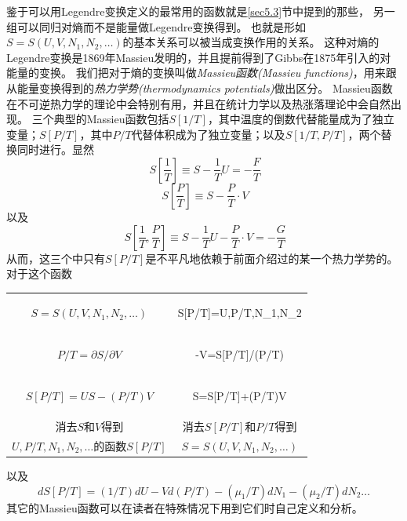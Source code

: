 鉴于可以用Legendre变换定义的最常用的函数就是\ref{sec5.3}节中提到的那些，
另一组可以同归对熵而不是能量做Legendre变换得到。
也就是形如$S=S(U,V,N_1,N_2,\dots)$的基本关系可以被当成变换作用的关系。
这种对熵的Legendre变换是1869年Massieu发明的，并且提前得到了Gibbs在1875年引入的对能量的变换。
我们把对于熵的变换叫做{\it Massieu函数(Massieu functions)}，用来跟从能量变换得到的{\it 热力学势(thermodynamics potentials)}做出区分。
Massieu函数在不可逆热力学的理论中会特别有用，并且在统计力学以及热涨落理论中会自然出现。
三个典型的Massieu函数包括$S[1/T]$，其中温度的倒数代替能量成为了独立变量；$S[P/T]$，其中$P/T$代替体积成为了独立变量；以及$S[1/T,P/T]$，两个替换同时进行。显然
\begin{equation}
\label{equ5.61}\
  S\left[\frac{1}{T}\right]\equiv S-\frac{1}{T}U=-\frac{F}{T}
\end{equation}
\begin{equation}
\label{equ5.62}\
  S\left[\frac{P}{T}\right]\equiv S-\frac{P}{T}\cdot V
\end{equation}
以及
\begin{equation}
\label{equ5.63}\
  S\left[\frac{1}{T},\frac{P}{T}\right]\equiv S-\frac{1}{T}U-\frac{P}{T}\cdot V=-\frac{G}{T}
\end{equation}
从而，这三个中只有$S[P/T]$是不平凡地依赖于前面介绍过的某一个热力学势的。
对于这个函数

\begin{tabular}{c|c}
\hline
$S=S(U,V,N_1,N_2,\dots) $& \begin{mymath}S[P/T]=U,P/T,N_1,N_2\text{的函数}\label{equ5.64}\end{mymath}\\
$P/T=\partial S/\partial V $& \begin{mymath}-V=\partial S[P/T]/\partial(P/T)\label{equ5.65} \end{mymath}\\
$S[P/T]=US-(P/T)V $& \begin{mymath}S=S[P/T]+(P/T)V \label{equ5.66} \end{mymath}\\
消去$S$和$V$得到 & 消去$S[P/T]$和$P/T$得到\\
$U,P/T,N_1,N_2,\dots$的函数$S[P/T]$ & $S=S(U,V,N_1,N_2,\dots)$ \\
\hline
\end{tabular}

以及
\begin{equation}
\label{5.67}
dS[P/T]=(1/T)dU-Vd(P/T)-(\mu_1/T)dN_1-(\mu_2/T)dN_2\dots
\end{equation}
其它的Massieu函数可以在读者在特殊情况下用到它们时自己定义和分析。
